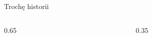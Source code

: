 \begin{frame}{Trochę historii}
\begin{columns}
\begin{column}{0.65\textwidth}
    \vspace{-3em}
    \begin{figure}
        \centering
        
    \end{figure}
    \vspace{-5em}
    \vspace{-5em}
\end{column}
\begin{column}{0.35\textwidth}
    \begin{figure}[H]
        \centering
         
    \end{figure}
    \vspace{1em}
\end{column}
\end{columns}

\end{frame}